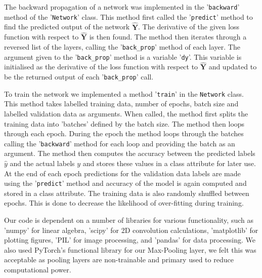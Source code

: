 \documentclass[twocolumn,pra,floatfix]{revtex4-2}
\begin{document}
            The backward propagation of a network was implemented in the 
            '\texttt{backward}' method of the '\texttt{Network}' class. This method first 
            called the '\texttt{predict}' method to find the predicted output of the
            network  $\mathbf{\hat{Y}}$. The derivative of the given loss function with
            respect to $\mathbf{\hat{Y}}$ is then found. The method then iterates 
            through a reversed list of the layers, calling the '\texttt{back\_prop}'
            method of each layer. The argument given to the '\texttt{back\_prop}' method
            is a variable '\texttt{dy}'. This variable is initialised as the derivative of
            the loss function with respect to $\mathbf{\hat{Y}}$ and updated to be the 
            returned output of each '\texttt{back\_prop}' call.

            To train the network we implemented a method '\texttt{train}' in the 
            \texttt{Network} class. This method takes labelled training data, number of 
            epochs, batch size and labelled validation data as arguments. When called, the 
            method first splits the training data into 'batches' defined by the batch size.
            The method then loops through each epoch. During the epoch the method loops
            through the batches calling the '\texttt{backward}' method for each loop and
            providing the batch as an argument. The method then computes the accuracy 
            between the predicted labels $\hat{y}$ and the actual labels $y$ and stores 
            these values in a class attribute for later use. At the end of each epoch 
            predictions for the validation data labels are made using the 
            '\texttt{predict}' method and accuracy of the model is again computed and
            stored in a class attribute. The training data is also randomly shuffled 
            between epochs. This is done to decrease the likelihood of over-fitting
            during training.

            Our code is dependent on a number of libraries for various functionality,
            such as 'numpy' \cite{numpy} for linear algebra, 'scipy' \cite{scipy} for 2D
            convolution calculations, 'matplotlib' \cite{matplotlib} for plotting
            figures, 'PIL' \cite{pillow} for image processing, and 'pandas' \cite{pandas} for data processing. We also used PyTorch's functional library \cite{torch} for our Max-Pooling layer, we felt this was acceptable as pooling layers are non-trainable and primary used to reduce computational power.
\end{document}

